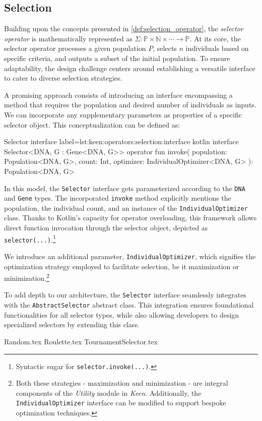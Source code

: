 \subsection{Selection}
\label{sec:keen:operators:selection}
  Building upon the concepts presented in \vref{def:selection_operator}, the 
  \emph{selector operator} is mathematically represented as \(\Sigma : \mathbb
  {P} \times \mathbb{N} \times \cdots \to \mathbb{P}\).
  At its core, the selector operator processes a given population 
  \(P\), selects \(n\) individuals based on specific criteria, and 
  outputs a subset of the initial population.
  To ensure adaptability, the design challenge centers around establishing a 
  versatile interface to cater to diverse selection strategies.

  A promising approach consists of introducing an interface encompassing a 
  method that requires the population and desired number of individuals as 
  inputs.
  We can incorporate any supplementary parameters as properties of a specific 
  selector object.
  This conceptualization can be defined as:

  \begin{code}{Selector interface}{
    label=lst:keen:operators:selection:interface
  }{kotlin}
    interface Selector<DNA, G : Gene<DNA, G>> {
      operator fun invoke(
          population: Population<DNA, G>,
          count: Int,
          optimizer: IndividualOptimizer<DNA, G>
      ): Population<DNA, G>
    }
  \end{code}

  In this model, the \texttt{Selector} interface gets parameterized according 
  to the \texttt{DNA} and \texttt{Gene} types.
  The incorporated \texttt{invoke} method explicitly mentions the population, 
  the individual count, and an instance of the \texttt{IndividualOptimizer} 
  class.
  Thanks to Kotlin's capacity for operator overloading, this framework allows 
  direct function invocation through the selector object, depicted as \texttt
  {selector(...)}.\footnote{Syntactic sugar for \texttt{selector.invoke(...)}.}

  We introduce an additional parameter, \texttt{IndividualOptimizer}, which 
  signifies the optimization strategy employed to facilitate selection, be it 
  maximization or minimization.\footnote{
    Both these strategies - maximization and minimization - are integral 
    components of the \textit{Utility} module in \textit{Keen}.
    Additionally, the \texttt{IndividualOptimizer} interface can be modified to 
    support bespoke optimization techniques.
  }

  \begin{remark}
    To add depth to our architecture, the \texttt{Selector} interface 
    seamlessly integrates with the \texttt{AbstractSelector} abstract class.
    This integration ensures foundational functionalities for all selector 
    types, while also allowing developers to design specialized selectors by 
    extending this class.
  \end{remark}

  {Random.tex}
  {Roulette.tex}
  {TournamentSelector.tex}
